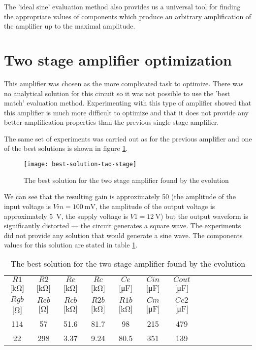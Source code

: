 The 'ideal sine' evaluation method also provides us a universal tool for finding the appropriate values of components which produce an arbitrary amplification of the amplifier up to the maximal amplitude.

\section{Two stage amplifier optimization} \label{2stage-results}
This amplifier was chosen as the more complicated task to optimize. There was no analytical solution for this circuit so it was not possible to use the 'best match' evaluation method. Experimenting with this type of amplifier showed that this amplifier is much more difficult to optimize and that it does not provide any better amplification properties than the previous single stage amplifier.

The same set of experiments was carried out as for the previous amplifier and one of the best solutions is shown in figure \ref{best-solution-two-stage-fig}.

\begin{figure}[ht]
    \centerline{\texttt{[image: best-solution-two-stage]}\label{best-solution-two-stage-fig}}
    \caption{The best solution for the two stage amplifier found by the evolution}
\end{figure}

We can see that the resulting gain is approximately 50 (the amplitude of the input voltage is $Vin = \SI{100}{\milli\volt}$, the amplitude of the output voltage is approximately \SI{5}{\volt}, the supply voltage is $V1 = \SI{12}{\volt}$) but the output waveform is significantly distorted --- the circuit generates a square wave. The experiments did not provide any solution that would generate a sine wave. The components values for this solution are stated in table \ref{best-solution-two-stage-tab}.

\begin{table}[H]
\centering
\begin{tabular}{@{}cccccccccccccc@{}}
\toprule
    $R1$ [\si{\kilo\ohm}] & $R2$ [\si{\kilo\ohm}] & $Re$ [\si{\kilo\ohm}] & $Rc$ [\si{\kilo\ohm}] & $Ce$ [\si{\micro\farad}] & $Cin$ [\si{\micro\farad}] & $Cout$ [\si{\micro\farad}] \\
    $Rgb$ [\si{\ohm}] & $Reb$ [\si{\ohm}] & $Rcb$ [\si{\kilo\ohm}] & $R2b$ [\si{\kilo\ohm}] & $R1b$ [\si{\kilo\ohm}] & $Cm$ [\si{\micro\farad}] & $Ce2$ [\si{\micro\farad}] \\
    \midrule
    114 & 57  & 51.6 & 81.7 & 98   & 215 & 479 & \\
    22  & 298 & 3.37 & 9.24 & 80.5 & 351 & 139   \\
    \bottomrule
\end{tabular}
\caption{The best solution for the two stage amplifier found by the evolution}
\label{best-solution-two-stage-tab}
\end{table}